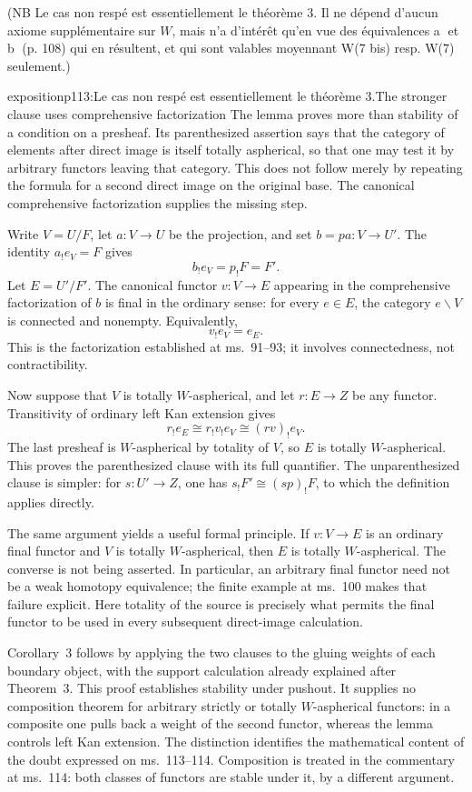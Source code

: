 (NB Le cas non respé est essentiellement le théorème 3. Il ne dépend d'aucun axiome supplémentaire sur $W$, mais n'a d'intérêt qu'en vue des équivalences \textcircled{a} et \textcircled{b} (p. 108) qui en résultent, et qui sont valables moyennant W(7 bis) resp. W(7) seulement.)

\begin{dcomment}{exposition}{p113:Le cas non respé est essentiellement le théorème 3.}{The stronger clause uses comprehensive factorization}
The lemma proves more than stability of a condition on a presheaf. Its parenthesized assertion says that the category of elements after direct image is itself totally aspherical, so that one may test it by arbitrary functors leaving that category. This does not follow merely by repeating the formula for a second direct image on the original base. The canonical comprehensive factorization supplies the missing step.

Write $V=U/F$, let $a:V\to U$ be the projection, and set $b=pa:V\to U'$. The identity $a_!e_V=F$ gives
\[
 b_!e_V=p_!F=F'.
\]
Let $E=U'/F'$. The canonical functor $v:V\to E$ appearing in the comprehensive factorization of $b$ is final in the ordinary sense: for every $e\in E$, the category $e\backslash V$ is connected and nonempty. Equivalently,
\[
 v_!e_V=e_E.
\]
This is the factorization established at ms.~91--93; it involves connectedness, not contractibility.

Now suppose that $V$ is totally $W$-aspherical, and let $r:E\to Z$ be any functor. Transitivity of ordinary left Kan extension gives
\[
 r_!e_E\cong r_!v_!e_V\cong(rv)_!e_V.
\]
The last presheaf is $W$-aspherical by totality of $V$, so $E$ is totally $W$-aspherical. This proves the parenthesized clause with its full quantifier. The unparenthesized clause is simpler: for $s:U'\to Z$, one has $s_!F'\cong(sp)_!F$, to which the definition applies directly.

The same argument yields a useful formal principle. If $v:V\to E$ is an ordinary final functor and $V$ is totally $W$-aspherical, then $E$ is totally $W$-aspherical. The converse is not being asserted. In particular, an arbitrary final functor need not be a weak homotopy equivalence; the finite example at ms.~100 makes that failure explicit. Here totality of the source is precisely what permits the final functor to be used in every subsequent direct-image calculation.

Corollary~3 follows by applying the two clauses to the gluing weights of each boundary object, with the support calculation already explained after Theorem~3. This proof establishes stability under pushout. It supplies no composition theorem for arbitrary strictly or totally $W$-aspherical functors: in a composite one pulls back a weight of the second functor, whereas the lemma controls left Kan extension. The distinction identifies the mathematical content of the doubt expressed on ms.~113--114. Composition is treated in the commentary at ms.~114: both classes of functors are stable under it, by a different argument.
\end{dcomment}


